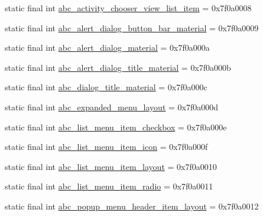 \begin{DoxyCompactItemize}
\item 
static final int \mbox{\hyperlink{classandroid_1_1support_1_1v7_1_1appcompat_1_1R_1_1layout_ac10665103daed966ab8508cf99909639}{abc\+\_\+activity\+\_\+chooser\+\_\+view\+\_\+list\+\_\+item}} = 0x7f0a0008
\item 
static final int \mbox{\hyperlink{classandroid_1_1support_1_1v7_1_1appcompat_1_1R_1_1layout_a44d5bb70c1b1f0b37bed5a6c23b8f616}{abc\+\_\+alert\+\_\+dialog\+\_\+button\+\_\+bar\+\_\+material}} = 0x7f0a0009
\item 
static final int \mbox{\hyperlink{classandroid_1_1support_1_1v7_1_1appcompat_1_1R_1_1layout_ad53166dc6778d14218c6ca8d20e4e365}{abc\+\_\+alert\+\_\+dialog\+\_\+material}} = 0x7f0a000a
\item 
static final int \mbox{\hyperlink{classandroid_1_1support_1_1v7_1_1appcompat_1_1R_1_1layout_a8e6f981e6a6ee8376544f1ddf58730be}{abc\+\_\+alert\+\_\+dialog\+\_\+title\+\_\+material}} = 0x7f0a000b
\item 
static final int \mbox{\hyperlink{classandroid_1_1support_1_1v7_1_1appcompat_1_1R_1_1layout_a12b7ab27647b0bb6ed58cf9504524932}{abc\+\_\+dialog\+\_\+title\+\_\+material}} = 0x7f0a000c
\item 
static final int \mbox{\hyperlink{classandroid_1_1support_1_1v7_1_1appcompat_1_1R_1_1layout_a740ce0b38776f4d29c2e8813885ceb2e}{abc\+\_\+expanded\+\_\+menu\+\_\+layout}} = 0x7f0a000d
\item 
static final int \mbox{\hyperlink{classandroid_1_1support_1_1v7_1_1appcompat_1_1R_1_1layout_a64416b615ad7fe019debb1562106f22b}{abc\+\_\+list\+\_\+menu\+\_\+item\+\_\+checkbox}} = 0x7f0a000e
\item 
static final int \mbox{\hyperlink{classandroid_1_1support_1_1v7_1_1appcompat_1_1R_1_1layout_a11266cae66dfb288775101ecda236866}{abc\+\_\+list\+\_\+menu\+\_\+item\+\_\+icon}} = 0x7f0a000f
\item 
static final int \mbox{\hyperlink{classandroid_1_1support_1_1v7_1_1appcompat_1_1R_1_1layout_aa5974647c5ae724bcf3b6054fcb11427}{abc\+\_\+list\+\_\+menu\+\_\+item\+\_\+layout}} = 0x7f0a0010
\item 
static final int \mbox{\hyperlink{classandroid_1_1support_1_1v7_1_1appcompat_1_1R_1_1layout_aba244980abc5dc6fe243c8f46131de84}{abc\+\_\+list\+\_\+menu\+\_\+item\+\_\+radio}} = 0x7f0a0011
\item 
static final int \mbox{\hyperlink{classandroid_1_1support_1_1v7_1_1appcompat_1_1R_1_1layout_abf109d49d65791b8484f93bcc52b6791}{abc\+\_\+popup\+\_\+menu\+\_\+header\+\_\+item\+\_\+layout}} = 0x7f0a0012

\end{DoxyCompactItemize}

